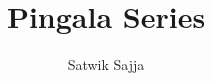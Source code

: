 \documentclass[journal,12pt,twocolumn]{IEEEtran}
\begin{document}
\makeatletter
{}
\makeatother
\let\StandardTheFigure\thefigure
\renewcommand{\thefigure}{\theproblem}
\def\putbox#1#2#3{\makebox[0in][l]{\makebox[#1][l]{}\raisebox{\baselineskip}[0in][0in]{\raisebox{#2}[0in][0in]{#3}}}}
     \def\rightbox#1{\makebox[0in][r]{#1}}
     \def\centbox#1{\makebox[0in]{#1}}
     \def\topbox#1{\raisebox{-\baselineskip}[0in][0in]{#1}}
     \def\midbox#1{\raisebox{-0.5\baselineskip}[0in][0in]{#1}}
\vspace{3cm}
\title{ 
Pingala Series
}
%
%
%
\author{ Satwik Sajja}
\end{document}
